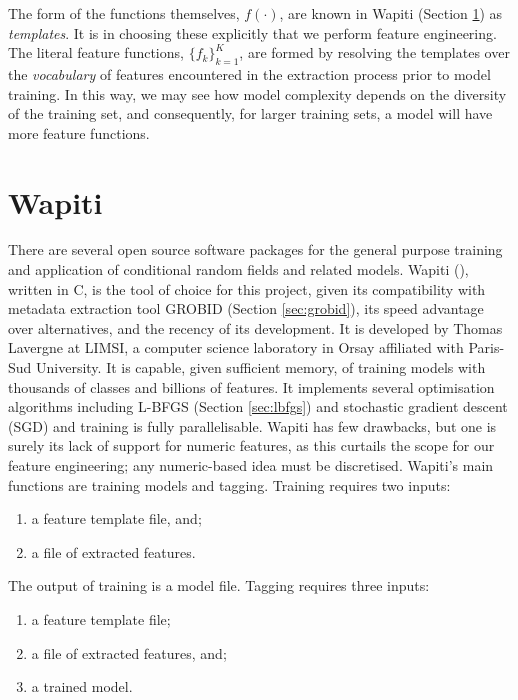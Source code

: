 The form of the functions themselves, $f(\cdot)$, are known in Wapiti (Section \ref{sec:wapiti}) as \emph{templates}. It is in choosing these explicitly that we perform feature engineering. The literal feature functions, $\{f_k\}_{k=1}^K$, are formed by resolving the templates over the \emph{vocabulary} of features encountered in the extraction process prior to model training. In this way, we may see how model complexity depends on the diversity of the training set, and consequently, for larger training sets, a model will have more feature functions. 

\section{Wapiti}
\label{sec:wapiti}

There are several open source software packages for the general purpose training and application of conditional random fields and related models. Wapiti (\cite{lavergne2010practical}), written in C, is the tool of choice for this project, given its compatibility with metadata extraction tool GROBID (Section \ref{sec:grobid}), its speed advantage over alternatives, and the recency of its development. It is developed by Thomas Lavergne at LIMSI, a computer science laboratory in Orsay affiliated with Paris-Sud University. It is capable, given sufficient memory, of training models with thousands of classes and billions of features. It implements several optimisation algorithms including L-BFGS (Section \ref{sec:lbfgs}) and stochastic gradient descent (SGD) and training is fully parallelisable. Wapiti has few drawbacks, but one is surely its lack of support for numeric features, as this curtails the scope for our feature engineering; any numeric-based idea must be discretised. Wapiti's main functions are training models and tagging. Training requires two inputs:

\begin{enumerate}
\item a feature template file, and;
\item a file of extracted features.
\end{enumerate}

The output of training is a model file. Tagging requires three inputs:

\begin{enumerate}
\item a feature template file;
\item a file of extracted features, and;
\item a trained model.
\end{enumerate}

